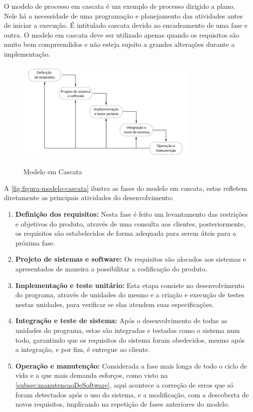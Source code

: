 O modelo de processo em cascata é um exemplo de processo dirigido a plano. Nele há a necessidade de uma programação e planejamento das atividades antes de iniciar a execução. É intitulado cascata devido ao encadeamento de uma fase e outra. O modelo em cascata deve ser utilizado apenas quando os requisitos são muito bem compreendidos e não esteja sujeito a grandes alterações durante a implementação. 

\begin{figure}[!htb]
    \centering
    \caption{Modelo em Cascata}
    \includegraphics[width=0.8\textwidth]{./dados/figuras/modeloEmCascata}
    \label{fig:figura-modelo-cascata}
\end{figure}

A \autoref{fig:figura-modelo-cascata} ilustra as fases do modelo em cascata, estas refletem diretamente as principais atividades do desenvolvimento:

\begin{enumerate}
    \item \textbf{Definição dos requisitos:} Nesta fase é feito um levantamento das restrições e objetivos do produto, através de uma consulta aos clientes, posteriormente, os requisitos são estabelecidos de forma adequada para serem úteis para a próxima fase.
    \item \textbf{Projeto de sistemas e software:} Os requisitos são alocados aos sistemas e apresentados de maneira a possibilitar a codificação do produto.
    \item \textbf{Implementação e teste unitário:} Esta etapa consiste no desenvolvimento do programa, através de unidades do mesmo e a criação e execução de testes nestas unidades, para verificar se elas atendem suas especificações. 
    \item \textbf{Integração e teste de sistema:} Após o desenvolvimento de todas as unidades do programa, estas são integradas e testadas como o sistema num todo, garantindo que os requisitos do sistema foram obedecidos, mesmo após a integração, e por fim, é entregue ao cliente.
    \item \textbf{Operação e manutenção:} Considerada a fase mais longa de todo o ciclo de vida e a que mais demanda esforços, como visto na \autoref{subsec:manutencaoDeSoftware}, aqui acontece a correção de erros que só foram detectados após o uso do sistema, e a modificação, com a descoberta de novos requisitos, implicando na repetição de fases anteriores do modelo. 
\end{enumerate}


